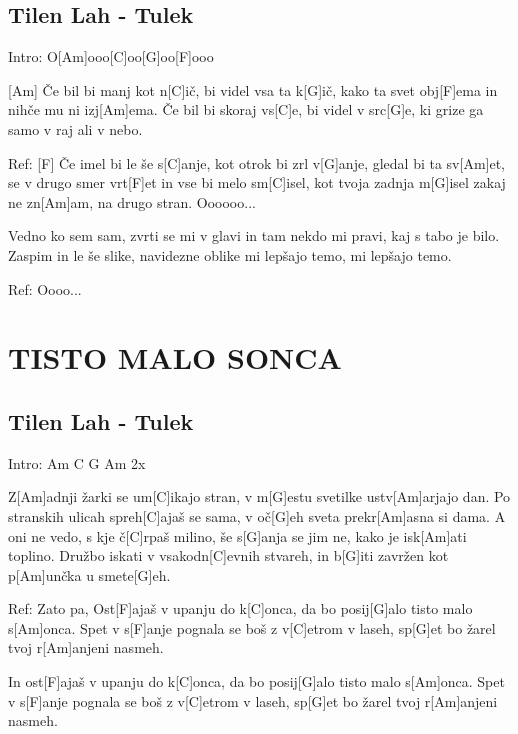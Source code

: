\documentclass{article}
\begin{document}
\subsection*{Tilen Lah - Tulek}
\begin{guitar}

	Intro: O[Am]ooo[C]oo[G]oo[F]ooo

	[Am] Če bil bi manj kot n[C]ič, bi videl vsa ta k[G]ič,
	kako ta svet obj[F]ema in nihče mu ni izj[Am]ema.
	Če bil bi skoraj vs[C]e, bi videl v src[G]e,
	ki grize ga samo v raj ali v nebo.
	\linebreak

	Ref:
	[F] Če imel bi le še s[C]anje,
	kot otrok bi zrl v[G]anje,
	gledal bi ta sv[Am]et, se v drugo smer vrt[F]et
	in vse bi melo sm[C]isel, kot tvoja zadnja m[G]isel
	zakaj ne zn[Am]am, na drugo stran.
	Oooooo...
	\linebreak

	Vedno ko sem sam, zvrti se mi v glavi
	in tam nekdo mi pravi, kaj s tabo je bilo.
	Zaspim in le še slike, navidezne oblike
	mi lepšajo temo, mi lepšajo temo.
	\linebreak

	Ref:
	Oooo...

\end{guitar}
\pagebreak

\section*{TISTO MALO SONCA}
%
\subsection*{Tilen Lah - Tulek}
\begin{guitar}
	Intro: Am C G Am 2x

	Z[Am]adnji žarki se um[C]ikajo stran,
	v m[G]estu svetilke ustv[Am]arjajo dan.
	Po stranskih ulicah spreh[C]ajaš se sama,
	v oč[G]eh sveta prekr[Am]asna si dama.
	A oni ne vedo, s kje č[C]rpaš milino,
	še s[G]anja se jim ne, kako je isk[Am]ati toplino.
	Družbo iskati v vsakodn[C]evnih stvareh,
	in b[G]iti zavržen kot p[Am]unčka u smete[G]eh.
	\linebreak
	
	Ref:
	Zato pa,
	Ost[F]ajaš v upanju do k[C]onca,
	da bo posij[G]alo tisto malo s[Am]onca.
	Spet v s[F]anje pognala se boš z v[C]etrom v laseh,
	sp[G]et bo žarel tvoj r[Am]anjeni nasmeh.
	\linebreak

	In ost[F]ajaš v upanju do k[C]onca,
	da bo posij[G]alo tisto malo s[Am]onca.
	Spet v s[F]anje pognala se boš z v[C]etrom v laseh,
	sp[G]et bo žarel tvoj r[Am]anjeni nasmeh.
	\linebreak

\end{guitar}
\pagebreak
\end{document}
